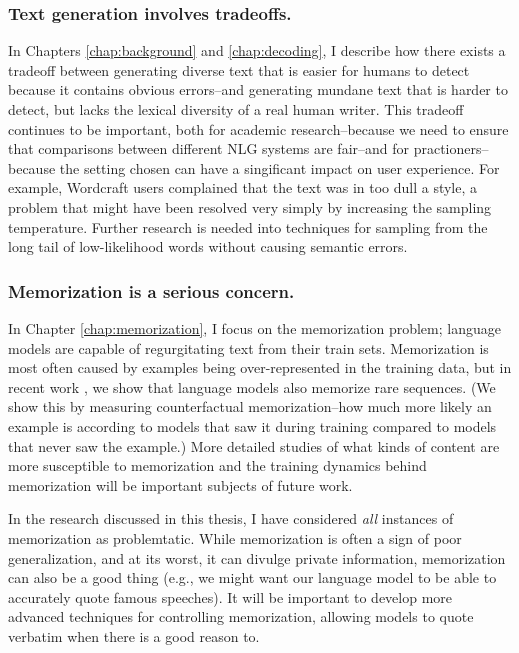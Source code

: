 \subsubsection{Text generation involves tradeoffs.}
	In Chapters \ref{chap:background} and \ref{chap:decoding}, I describe how there exists a tradeoff between generating diverse text that is easier for humans to detect because it contains obvious errors--and generating mundane text that is harder to detect, but lacks the lexical diversity of a real human writer.
	This tradeoff continues to be important, both for academic research--because we need to ensure that  comparisons between different NLG systems are fair--and for practioners--because the setting chosen can have a singificant impact on user experience.
	For example, Wordcraft users complained that the text was in too dull a style, a problem that might have been resolved very simply by increasing the sampling temperature.
	Further research is needed into techniques for sampling from the long tail of low-likelihood words without causing semantic errors.

\subsubsection{Memorization is a serious concern.}
	In Chapter \ref{chap:memorization}, I focus on the memorization problem; language models are capable of regurgitating text from their train sets.
	Memorization is most often caused by examples being over-represented in the training data, but in recent work \citep{zhang2021counterfactual}, we show that language models also memorize rare sequences.
	(We show this by measuring counterfactual memorization--how much more likely an example is according to models that saw it during training compared to models that never saw the example.)
	More detailed studies of what kinds of content are more susceptible to memorization and the training dynamics behind memorization will be important subjects of future work.

	In the research discussed in this thesis, I have considered \textit{all} instances of memorization as problemtatic.
	While memorization is often a sign of poor generalization, and at its worst, it can divulge private information, memorization can also be a good thing (e.g., we might want our language model to be able to accurately quote famous speeches).
	It will be important to develop more advanced techniques for controlling memorization, allowing models to quote verbatim when there is a good reason to.


